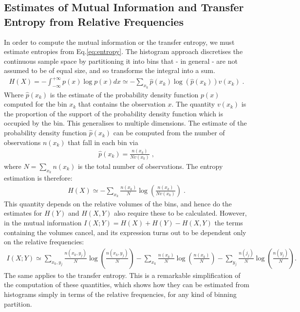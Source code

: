 \documentclass[]{rsos}%
\begin{document}
{ \subsection{Estimates of Mutual Information and Transfer Entropy from Relative Frequencies}
 In order to compute the mutual information or the transfer entropy, we must estimate entropies from Eq.\ref{eq:entropy}.
 The histogram approach discretises the continuous sample space by partitioning it into bins that - in general - are not assumed to be of equal size, and so transforms the integral into a sum.
  \begin{eqnarray}
    \label{eq:entropyDiscrere}
    H(X) = - \int_{-\infty}^{+\infty}  {  p(x) \log{  p(x)}  } dx \simeq - \sum_{x_k}  \hat p(x_k) \log\left({ \hat p(x_k)}\right) v(x_k)\;.
  \end{eqnarray}
Where $\hat p(x_k)$ is the estimate of the probability density function $p(x)$ computed for the bin $x_k$ that contains the observation $x$.
The quantity $v(x_k)$ is the proportion of the support of the probability density function which is occupied by the bin. This generalises to multiple dimensions.
The estimate of the probability density function $\hat p(x_k)$ can be computed from the number of observations $n(x_k)$ that fall in each bin via
    \begin{eqnarray}
    \label{eq:pdfDiscrere}
 \hat p(x_k) = \frac{n(x_k)}{N v(x_k)}\;,
  \end{eqnarray}
where $N=\sum_{x_k} n(x_k)$ is the total number of observations. 
The entropy estimation is therefore:
  \begin{eqnarray}
    \label{eq:entropyDiscrere1}
    H(X) \simeq - \sum_{x_k}   \frac{n(x_k)}{N } \log\left({  \frac{n(x_k)}{N v(x_k)} }\right) \;.
  \end{eqnarray}
This quantity depends on the relative volumes of the bins, and hence do the estimates for $H(Y)$ and $H(X,Y)$ also require these to be calculated. However, in the mutual information $I(X;Y) = H(X)+H(Y)-H(X,Y)$ the terms containing the volumes cancel, and its expression turns out to be dependent only on the relative frequencies:
  \begin{eqnarray}
    \label{eq:mutualnfoDiscrere}
  I(X;Y) \! \simeq \!
 \! \!\sum_{x_k,y_j} \!\!\frac{n(x_k,y_j)}{N } \log\left({  \frac{n(x_k,y_j)}{N} }\right)
   -\! \sum_{x_k}      \! \frac{n(x_k)}{N } \log\left({  \frac{n(x_k)}{N} }\right) 
  - \!\sum_{y_j}        \!\frac{n(j_j)}{N } \log\left({  \frac{n(y_j)}{N} }\right) .
  \end{eqnarray}
  The same applies to the transfer entropy. 
  This is a remarkable simplification of the computation of these quantities, which shows how they can be estimated from histograms simply in terms of the relative frequencies, for any kind of binning partition.
 
}
\end{document}

